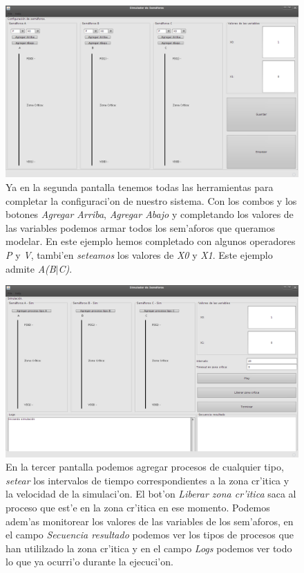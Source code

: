 \begin{figure}[h!]
\centering
 \includegraphics[scale=0.33,keepaspectratio=true]{./imagenes/semaforo/semaforos2.png}
 \caption{Ya en la segunda pantalla tenemos todas las herramientas para completar la configuraci'on de nuestro sistema. Con los combos y los botones \emph{Agregar Arriba}, \emph{Agregar Abajo} y completando los valores de las variables podemos armar todos los sem'aforos que queramos modelar. En este ejemplo hemos completado con algunos operadores \emph{P} y \emph{V}, tambi'en \emph{seteamos} los valores de \emph{X0} y \emph{X1}. Este ejemplo admite \emph{A(B}$|$\emph{C)}.}
\end{figure}

\begin{figure}[h!]
\centering
 \includegraphics[scale=0.33,keepaspectratio=true]{./imagenes/semaforo/semaforos3.png}
 \caption{En la tercer pantalla podemos agregar procesos de cualquier tipo,
\emph{setear} los intervalos de tiempo correspondientes a la zona cr'itica y la
velocidad de la simulaci'on. El bot'on \emph{Liberar zona cr'itica}
saca al proceso que est'e en la zona cr'itica en ese momento. Podemos adem'as
monitorear los valores de las variables de
los sem'aforos, en el campo \emph{Secuencia resultado} podemos ver los tipos de
procesos que han utililzado la zona cr'itica y en el campo \emph{Logs} podemos
ver todo lo que ya ocurri'o durante la ejecuci'on.}
\end{figure}
\newpage

